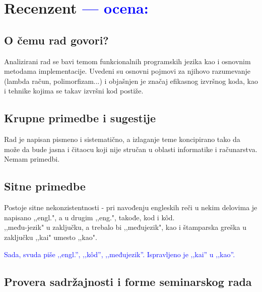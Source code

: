 \documentclass[a4paper]{report}
\newcommand{\odgovor}[1]{\textcolor{blue}{#1}}
\begin{document}
\chapter{Recenzent \odgovor{--- ocena:} }

\section{O čemu rad govori?}
Analizirani rad se bavi temom funkcionalnih programskih jezika kao i osnovnim metodama implementacije. Uvedeni su osnovni pojmovi za njihovo razumevanje (lambda račun, polimorfizam...) i objašnjen je značaj efikasnog izvršnog koda, kao i tehnike kojima se takav izvršni kod postiže.

\section{Krupne primedbe i sugestije}
Rad je napisan pismeno i sistematično, a izlaganje teme koncipirano tako da može da bude jasna i čitaocu koji nije stručan u oblasti informatike i računarstva. Nemam primedbi.

\section{Sitne primedbe}
Postoje sitne nekonzistentnosti - pri navođenju engleskih reči u nekim delovima je napisano ,,engl.", a u drugim ,,eng.", takođe, kod i k\^{o}d. \\ ,,među-jezik" u zaključku, a trebalo bi ,,međujezik", kao i štamparska greška u zaključku ,,kai" umesto ,,kao".

\odgovor{Sada, svuda piše ‚‚engl.'', ‚‚k\^od'', ‚‚međujezik''. Ispravljeno je ‚‚kai'' u ‚‚kao''.}


\section{Provera sadržajnosti i forme seminarskog rada}
\end{document}
